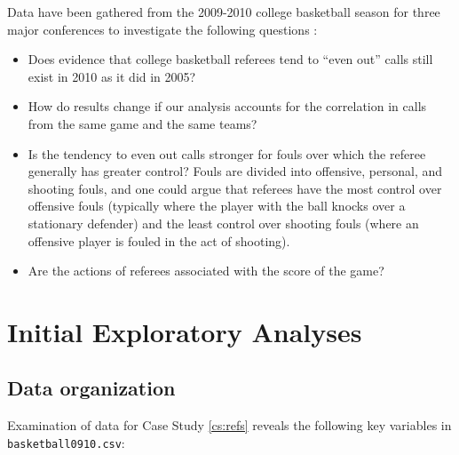 \documentclass[
]{krantz}
\providecommand{\tightlist}{%
  \setlength{\itemsep}{0pt}\setlength{\parskip}{0pt}}
\begin{document}
Data have been gathered from the 2009-2010 college basketball season for three major conferences to investigate the following questions \citep{Noecker2012}:

\begin{itemize}
\tightlist
\item
  Does evidence that college basketball referees tend to ``even out'' calls still exist in 2010 as it did in 2005?
\item
  How do results change if our analysis accounts for the correlation in calls from the same game and the same teams?
\item
  Is the tendency to even out calls stronger for fouls over which the referee generally has greater control? Fouls are divided into offensive, personal, and shooting fouls, and one could argue that referees have the most control over offensive fouls (typically where the player with the ball knocks over a stationary defender) and the least control over shooting fouls (where an offensive player is fouled in the act of shooting).
\item
  Are the actions of referees associated with the score of the game?
\end{itemize}

\hypertarget{explore-glmm}{%
\section{Initial Exploratory Analyses}\label{explore-glmm}}

\hypertarget{data-organization-5}{%
\subsection{Data organization}\label{data-organization-5}}

Examination of data for Case Study \ref{cs:refs} reveals the following key variables in \texttt{basketball0910.csv}:
\end{document}
